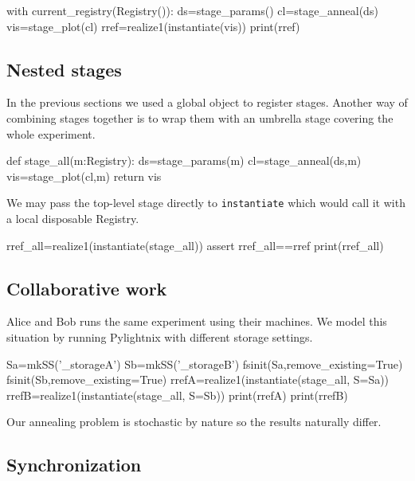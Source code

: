 \begin{pythontexcode}
with current_registry(Registry()):
  ds=stage_params()
  cl=stage_anneal(ds)
  vis=stage_plot(cl)
  rref=realize1(instantiate(vis))
  print(rref)
\end{pythontexcode}

\mystdout

\subsection{Nested stages}

In the previous sections we used a global
 object to register stages. Another way
of combining stages together is to wrap them with an umbrella stage covering the
whole experiment.

\begin{pythontexcode}
def stage_all(m:Registry):
  ds=stage_params(m)
  cl=stage_anneal(ds,m)
  vis=stage_plot(cl,m)
  return vis
\end{pythontexcode}

We may pass the top-level stage directly to \texttt{instantiate}
which would call it with a local disposable Registry.

\begin{pythontexcode}
rref_all=realize1(instantiate(stage_all))
assert rref_all==rref
print(rref_all)
\end{pythontexcode}

\mystdout


\subsection{Collaborative work}

Alice and Bob runs the same experiment using their machines. We model
this situation by running Pylightnix with different storage settings.

\begin{pythontexcode}
Sa=mkSS('_storageA')
Sb=mkSS('_storageB')
fsinit(Sa,remove_existing=True)
fsinit(Sb,remove_existing=True)
rrefA=realize1(instantiate(stage_all, S=Sa))
rrefB=realize1(instantiate(stage_all, S=Sb))
print(rrefA)
print(rrefB)
\end{pythontexcode}

Our annealing problem is stochastic by nature so the results naturally differ.

\subsection{Synchronization}

